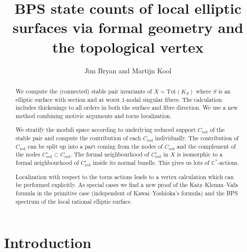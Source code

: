 \documentclass[12pt]{amsart}
\theoremstyle{definition}
\theoremstyle{property}
\newcommand\red{\mathrm{red}}
\newcommand\C{\mathbb C}
\renewcommand\_{^{}_}
\begin{document}
\title{BPS state counts of local elliptic surfaces via formal geometry and the topological vertex}
\author[J.~Bryan, M.~Kool]{Jim Bryan and Martijn Kool \vspace{-5mm}}
\maketitle

\begin{abstract}
We compute the (connected) stable pair invariants of $X = \mathrm{Tot}(K_S)$ where $S$ is an elliptic surface with section and at worst 1-nodal singular fibres. The calculation includes thickenings to all orders in both the surface and fibre direction. We use a new method combining motivic arguments and torus localization. 

We stratify the moduli space according to underlying reduced support $C_{\red}$ of the stable pair and compute the contribution of each $C_{\red}$ individually. The contribution of $C_{\red}$ can be split up into a part coming from the nodes of $C_{\red}$ and the complement of the nodes $C_{\red}^{\circ} \subset C_{\red}$. The formal neighbourhood of $C_{\red}^{\circ}$ in $X$ is isomorphic to a formal neighbourhood of $C_{\red}^{\circ}$ inside its normal bundle. This gives us lots of $\C^{*}$-actions. 

Localization with respect to the torus actions leads to a vertex calculation which can be performed explicitly. As special cases we find a new proof of the Katz--Klemm--Vafa formula in the primitive case (independent of Kawai--Yoshioka's formula) and the BPS spectrum of the local rational elliptic surface.
\end{abstract}
\thispagestyle{empty}

\tableofcontents


\section{Introduction}
\end{document}
